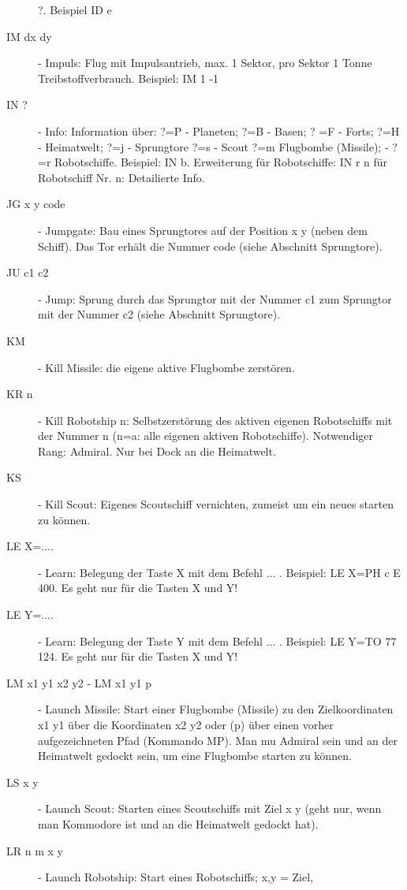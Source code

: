 \begin{description}
      ?. Beispiel ID e
\item [IM dx dy] - Impuls: Flug mit Impulsantrieb, max. 1 Sektor, pro Sektor 
          1 Tonne Treibstoffverbrauch. Beispiel: IM 1 -1
\item [IN ?] - Info: Information \"uber: ?=P - Planeten; ?=B - Basen; ?
      =F - Forts; ?=H - Heimatwelt; ?=j - Sprungtore ?=s - Scout ?=m 
      Flugbombe (Missile); - ?=r Robotschiffe. Beispiel: IN b. Erweiterung 
      f\"ur Robotschiffe: IN r n f\"ur Robotschiff Nr. n: Detailierte Info.
\item [JG x y code] - Jumpgate: Bau eines Sprungtores auf der Position x y
          (neben dem Schiff). Das Tor erh\"alt die Nummer code (siehe Abschnitt
          Sprungtore).
\item [JU c1 c2] - Jump: Sprung durch das Sprungtor mit der Nummer c1 zum
          Sprungtor mit der Nummer c2 (siehe Abschnitt Sprungtore).
\item [KM] - Kill Missile: die eigene aktive Flugbombe zerst\"oren.
\item [KR n] - Kill Robotship n: Selbstzerst\"orung des aktiven eigenen 
               Robotschiffs mit der Nummer n (n=a: alle eigenen aktiven
               Robotschiffe).  Notwendiger Rang: Admiral. Nur bei Dock an die
               Heimatwelt.
\item [KS] - Kill Scout: Eigenes Scoutschiff vernichten, zumeist um ein neues
          starten zu k\"onnen.
\item [LE X=....] - Learn: Belegung der Taste X mit dem Befehl ... .
      Beispiel: LE X=PH c E 400. Es geht nur f\"ur die Tasten X und Y!
\item [LE Y=....] - Learn: Belegung der Taste Y mit dem Befehl ... .
      Beispiel: LE Y=TO 77 124. Es geht nur f\"ur die Tasten X und Y!
\item [LM x1 y1 x2 y2 -  LM x1 y1 p] - Launch Missile: Start einer Flugbombe 
                (Missile) zu den Zielkoordinaten
                x1 y1 \"uber die Koordinaten x2 y2 oder (p) \"uber einen vorher
                aufgezeichneten Pfad (Kommando MP).  
                Man mu\3 Admiral sein und an der Heimatwelt gedockt sein, 
                um eine Flugbombe starten zu k\"onnen.
\item [LS x y] - Launch Scout: Starten eines Scoutschiffs mit Ziel x y (geht
                 nur, wenn man Kommodore ist und an die Heimatwelt gedockt 
                 hat).
\item [LR n m x y] - Launch Robotship: Start eines Robotschiffs; x,y = Ziel,

\end{description}
